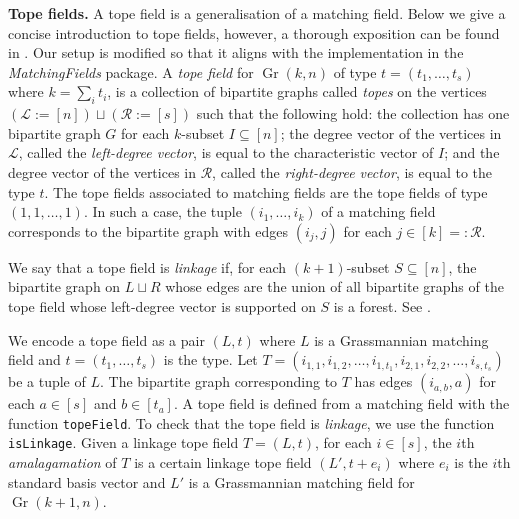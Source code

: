 \documentclass[11pt]{article}
\newcommand{\ML}{\mathcal L}
\newcommand{\MR}{\mathcal R}
\DeclareMathOperator{\Gr}{Gr}
\theoremstyle{plain}
\theoremstyle{definition}
\theoremstyle{remark}
\begin{document}
\medskip

\noindent
\textbf{Tope fields.}
A tope field is a generalisation of a matching field. Below we give a concise introduction to tope fields, however, a thorough exposition can be found in \cite{loho2020matching}. Our setup is modified so that it aligns with the implementation in the \textit{MatchingFields} package. A \textit{tope field} for $\Gr(k,n)$ of type $t = (t_1, \dots, t_s)$ where $k = \sum_i t_i$, is a collection of bipartite graphs called \textit{topes} on the vertices $(\ML :=[n]) \sqcup (\MR := [s])$ such that the following hold: the collection has one bipartite graph $G$ for each $k$-subset $I \subseteq [n]$; the degree vector of the vertices in $\ML$, called the \textit{left-degree vector}, is equal to the characteristic vector of $I$; and the degree vector of the vertices in $\MR$, called the \textit{right-degree vector}, is equal to the type $t$. The tope fields associated to matching fields are the tope fields of type $(1,1,\dots, 1)$. In such a case, the tuple $(i_1, \dots, i_k)$ of a matching field corresponds to the bipartite graph with edges $(i_j, j)$ for each $j \in [k] =: \MR$.

We say that a tope field is \textit{linkage} if, for each $(k+1)$-subset $S \subseteq [n]$, the bipartite graph on $L \sqcup R$ whose edges are the union of all bipartite graphs of the tope field whose left-degree vector is supported on $S$ is a forest. See \cite[Definition~3.1]{loho2020matching}.

We encode a tope field as a pair $(L, t)$ where $L$ is a Grassmannian matching field and $t = (t_1, \dots, t_s)$ is the type. Let $T = (i_{1,1}, i_{1,2}, \dots, i_{1,t_1}, i_{2,1}, i_{2,2}, \dots, i_{s, t_s})$ be a tuple of $L$. The bipartite graph corresponding to $T$ has edges $(i_{a,b}, a)$ for each $a \in [s]$ and $b \in [t_a]$. A tope field is defined from a matching field with the function \texttt{topeField}. To check that the tope field is \textit{linkage}, we use the function \texttt{isLinkage}. Given a linkage tope field $T = (L, t)$, for each $i \in [s]$, the $i$th \textit{amalagamation} of $T$ is a certain linkage tope field $(L', t + e_i)$ where $e_i$ is the $i$th standard basis vector and $L'$ is a Grassmannian matching field for $\Gr(k+1, n)$.
\end{document}
